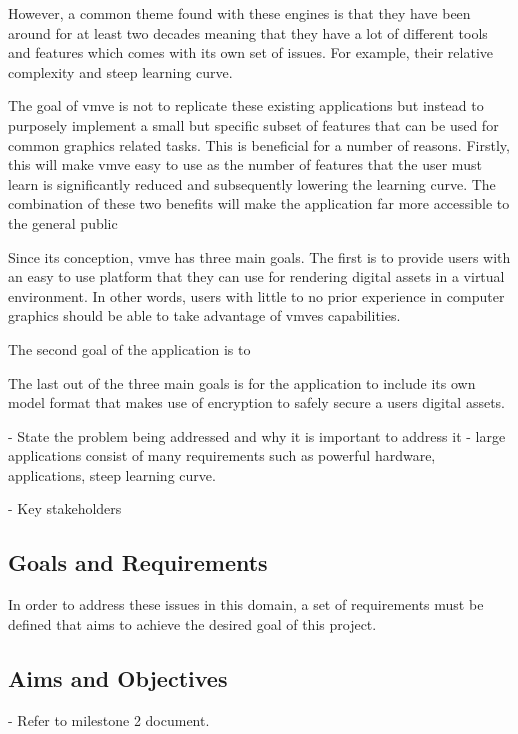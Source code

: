 \documentclass[11pt]{article}
\begin{document}
However, a common theme found with these engines is that  they have been around
for at least two decades meaning that they have a lot of different tools and
features which comes with its own set of issues. For example, their relative
complexity and steep learning curve.

The goal of \gls{vmve} is not to replicate these existing applications but instead
to purposely implement a small but specific subset of features that can be used
for common graphics related tasks. This is beneficial for a number of reasons.
Firstly, this will make \gls{vmve} easy to use as the number of features that the
user must learn is significantly reduced and subsequently lowering the learning 
curve. The combination of these two benefits will make the application far more
accessible to the general public

Since its conception, \gls{vmve} has three main goals. The first is to provide
users with an easy to use platform that they can use for rendering digital
assets in a virtual environment. In other words, users with little to no prior
experience in computer graphics should be able to take advantage of \glspl{vmve} 
capabilities.

The second goal of the application is to 


The last out of the three main goals is for the application to include its own
model format that makes use of encryption to safely secure a users digital
assets.




- State the problem being
addressed and why it is important to address it - large applications
consist of many requirements such as powerful hardware, applications,
steep learning curve.

- Key stakeholders

\subsection{Goals and Requirements}
In order to address these issues in this domain, a set of requirements
must be defined that aims to achieve the desired goal of this project.

\subsection{Aims and Objectives}
- Refer to milestone 2 document.
\end{document}
